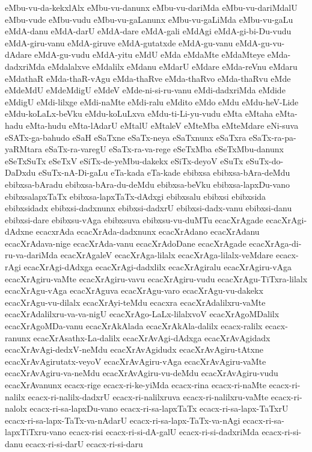 {eMbu-vu-da-kekxlAlx
eMbu-vu-danunx
eMbu-vu-dariMda
eMbu-vu-dariMdalU
eMbu-vude
eMbu-vudu
eMbu-vu-gaLanunx
eMbu-vu-gaLiMda
eMbu-vu-gaLu
eMdA-danu
eMdA-darU
eMdA-dare
eMdA-gali
eMdAgi
eMdA-gi-bi-Du-vudu
eMdA-giru-vanu
eMdA-giruve
eMdA-gutatxde
eMdA-gu-vanu
eMdA-gu-vu-dAdare
eMdA-gu-vudu
eMdA-yitu
eMdU
eMda
eMdaMte
eMdaMteye
eMda-dadxriMda
eMdalalxve
eMdalilx
eMdanu
eMdarU
eMdare
eMda-reVnu
eMdaru
eMdathaR
eMda-thaR-vAgu
eMda-thaRve
eMda-thaRvo
eMda-thaRvu
eMde
eMdeMdU
eMdeMdigU
eMdeV
eMde-ni-si-ru-vanu
eMdi-dadxriMda
eMdide
eMdigU
eMdi-lilxge
eMdi-naMte
eMdi-ralu
eMdito
eMdo
eMdu
eMdu-heV-Lide
eMdu-koLaLx-beVku
eMdu-koLuLxva
eMdu-ti-Li-yu-vudu
eMta
eMtaha
eMta-hadu
eMta-hudu
eMta-lAdarU
eMtalU
eMtaleV
eMteMba
eMteMdare
eNi-suva
eSATx-ga-bahudo
eSaH
eSaTxne
eSaTx-neya
eSaTxnunx
eSaTxra
eSaTx-ra-pa-yaRMtara
eSaTx-ra-varegU
eSaTx-ra-va-rege
eSeTxMba
eSeTxMbu-danunx
eSeTxSuTx
eSeTxV
eSiTx-de-yeMbu-dakekx
eSiTx-deyoV
eSuTx
eSuTx-do-DaDxdu
eSuTx-nA-Di-gaLu
eTa-kada
eTa-kade
ebibxsa
ebibxsa-bAra-deMdu
ebibxsa-bAradu
ebibxsa-bAra-du-deMdu
ebibxsa-beVku
ebibxsa-lapxDu-vano
ebibxsalapxTaTx
ebibxsa-lapxTaTx-dAdxgi
ebibxsalu
ebibxsi
ebibxsida
ebibxsidadx
ebibxsi-dadxnunx
ebibxsi-dadxrU
ebibxsi-dadx-vanu
ebibxsi-danu
ebibxsi-dare
ebibxsu-vAga
ebibxsuva
ebibxsu-vu-duMTu
ecacXrAgade
ecacXrAgi-dAdxne
ecacxrAda
ecacXrAda-dadxnunx
ecacXrAdano
ecacXrAdanu
ecacXrAdava-nige
ecacXrAda-vanu
ecacXrAdoDane
ecacXrAgade
ecacXrAga-di-ru-va-dariMda
ecacXrAgaleV
ecacXrAga-lilalx
ecacXrAga-lilalx-veMdare
ecacx-rAgi
ecacXrAgi-dAdxga
ecacXrAgi-dadxlilx
ecacXrAgiralu
ecacXrAgiru-vAga
ecacXrAgiru-vaMte
ecacXrAgiru-vavu
ecacXrAgiru-vudu
ecacXrAgu-TiTxra-lilalx
ecacXrAgu-vAga
ecacXrAguva
ecacXrAgu-varo
ecacXrAgu-vu-dakekx
ecacXrAgu-vu-dilalx
ecacXrAyi-teMdu
ecacxra
ecacXrAdalilxru-vaMte
ecacXrAdalilxru-va-va-nigU
ecacXrAgo-LaLx-lilalxvoV
ecacXrAgoMDalilx
ecacXrAgoMDa-vanu
ecacXrAkAlada
ecacXrAkAla-dalilx
ecacx-ralilx
ecacx-ranunx
ecacXrAsathx-La-dalilx
ecacXrAvAgi-dAdxga
ecacXrAvAgidadx
ecacXrAvAgi-dedxV-neMdu
ecacXrAvAgidudx
ecacXrAvAgiru-tAtxne
ecacXrAvAgirutatx-veyoV
ecacXrAvAgiru-vAga
ecacXrAvAgiru-vaMte
ecacXrAvAgiru-va-neMdu
ecacXrAvAgiru-vu-deMdu
ecacXrAvAgiru-vudu
ecacXrAvanunx
ecacx-rige
ecacx-ri-ke-yiMda
ecacx-rina
ecacx-ri-naMte
ecacx-ri-nalilx
ecacx-ri-nalilx-dadxrU
ecacx-ri-nalilxruva
ecacx-ri-nalilxru-vaMte
ecacx-ri-nalolx
ecacx-ri-sa-lapxDu-vano
ecacx-ri-sa-lapxTaTx
ecacx-ri-sa-lapx-TaTxrU
ecacx-ri-sa-lapx-TaTx-va-nAdarU
ecacx-ri-sa-lapx-TaTx-va-nAgi
ecacx-ri-sa-lapxTiTxru-vano
ecacx-risi
ecacx-ri-si-dA-galU
ecacx-ri-si-dadxriMda
ecacx-ri-si-danu
ecacx-ri-si-darU
ecacx-ri-si-daru
}
